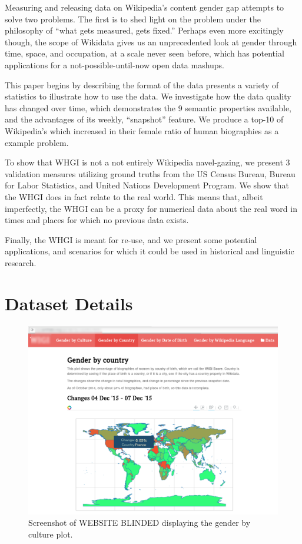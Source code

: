 \documentclass[letterpaper]{article}
\begin{document}
Measuring and releasing data on Wikipedia's content gender gap attempts to solve two problems. The first is to shed light on the problem under the philosophy of ``what gets measured, gets fixed.'' Perhaps even more excitingly though, the scope of Wikidata gives us an unprecedented look at gender through time, space, and occupation, at a scale never seen before, which has potential applications for a not-possible-until-now open data mashups.

This paper begins by describing the format of the data presents a variety of statistics to illustrate how to use the data. We investigate how the data quality has changed over time, which demonstrates the 9 semantic properties available, and the advantages of its weekly, ``snapshot'' feature. We produce a top-10 of Wikipedia’s which increased in their female ratio of human biographies as a example problem. 

To show that WHGI is not a not entirely Wikipedia navel-gazing, we present 3 validation measures utilizing ground truths from the US Census Bureau, Bureau for Labor Statistics, and United Nations Development Program. We show that the WHGI does in fact relate to the real world. This means that, albeit imperfectly, the WHGI can be a proxy for numerical data about the real word in times and places for which no previous data exists.

Finally, the WHGI is meant for re-use, and we present some potential applications, and scenarios for which it could be used in historical and linguistic research.  

\section{Dataset Details}

\begin{figure}
\label{fig:screenshot}
\includegraphics[scale=0.2]{figures/website_screenshot.png} 
\caption{Screenshot of WEBSITE BLINDED displaying the gender by culture plot.}
\end{figure}
\end{document}
